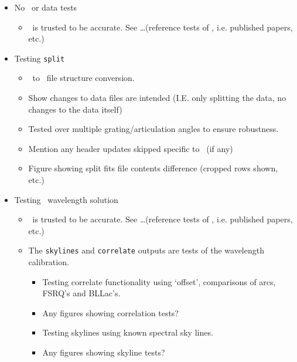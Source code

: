 \begin{itemize}
    \item No \polsalt\ or data tests
    \begin{itemize}
        \item \polsalt\ is trusted to be accurate. See \dots (reference tests of \polsalt, i.e. published papers, etc.)
    \end{itemize}
    
    \item Testing \texttt{split}
    \begin{itemize}
        \item \polsalt\ to \iraf\ file structure conversion.
        \item Show changes to data files are intended (I.E. only splitting the data, no changes to the data itself)
        \item Tested over multiple grating/articulation angles to ensure robustness.
        \item Mention any header updates skipped specific to \polsalt\ (if any)
        \item Figure showing split fits file contents difference (cropped rows shown, etc.)
    \end{itemize}
    
    \item Testing \iraf\ wavelength solution
    \begin{itemize}
        \item \iraf\ is trusted to be accurate. See \dots (reference tests of \iraf, i.e. published papers, etc.)
        \item The \texttt{skylines} and \texttt{correlate} outputs are tests of the wavelength calibration.
        \begin{itemize}
            \item Testing correlate functionality using `offset', comparisons of arcs, FSRQ's and BLLac's.
            \item Any figures showing correlation tests?
            \item Testing skylines using known spectral sky lines.
            \item Any figures showing skyline tests?
        \end{itemize}
    \end{itemize}


\end{itemize}
